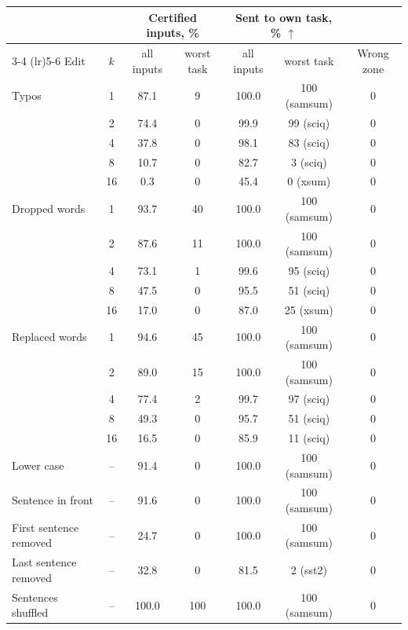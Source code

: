 \begin{tabular}{lcccccc}
    \toprule
    & & \multicolumn{2}{c}{Certified inputs, \%} & \multicolumn{2}{c}{Sent to own task, \% $\uparrow$} & \\
    \cmidrule(lr){3-4} \cmidrule(lr){5-6}
    Edit & $k$ & all inputs & worst task & all inputs & worst task & Wrong zone \\
    \midrule
    Typos & 1 & 87.1 & 9 & 100.0 & 100 (samsum) & 0 \\
     & 2 & 74.4 & 0 & 99.9 & 99 (sciq) & 0 \\
     & 4 & 37.8 & 0 & 98.1 & 83 (sciq) & 0 \\
     & 8 & 10.7 & 0 & 82.7 & 3 (sciq) & 0 \\
     & 16 & 0.3 & 0 & 45.4 & 0 (xsum) & 0 \\
    \midrule
    Dropped words & 1 & 93.7 & 40 & 100.0 & 100 (samsum) & 0 \\
     & 2 & 87.6 & 11 & 100.0 & 100 (samsum) & 0 \\
     & 4 & 73.1 & 1 & 99.6 & 95 (sciq) & 0 \\
     & 8 & 47.5 & 0 & 95.5 & 51 (sciq) & 0 \\
     & 16 & 17.0 & 0 & 87.0 & 25 (xsum) & 0 \\
    \midrule
    Replaced words & 1 & 94.6 & 45 & 100.0 & 100 (samsum) & 0 \\
     & 2 & 89.0 & 15 & 100.0 & 100 (samsum) & 0 \\
     & 4 & 77.4 & 2 & 99.7 & 97 (sciq) & 0 \\
     & 8 & 49.3 & 0 & 95.7 & 51 (sciq) & 0 \\
     & 16 & 16.5 & 0 & 85.9 & 11 (sciq) & 0 \\
    \midrule
    Lower case & -- & 91.4 & 0 & 100.0 & 100 (samsum) & 0 \\
    Sentence in front & -- & 91.6 & 0 & 100.0 & 100 (samsum) & 0 \\
    First sentence removed & -- & 24.7 & 0 & 100.0 & 100 (samsum) & 0 \\
    Last sentence removed & -- & 32.8 & 0 & 81.5 & 2 (sst2) & 0 \\
    Sentences shuffled & -- & 100.0 & 100 & 100.0 & 100 (samsum) & 0 \\
    \bottomrule
\end{tabular}
